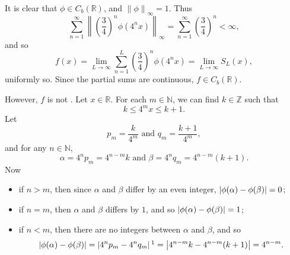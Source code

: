 \documentclass[notoc,notitlepage]{tufte-book}
\newcommand{\norm}[1]{\left\| #1 \right\|}
\begin{document}
\begin{eg}
  It is clear that $\phi \in C_b(\mathbb{R})$, and $\norm{ \phi }_\infty = 1$. Thus
  \begin{equation*}
    \sum_{n=1}^{\infty} \norm{ \left( \frac{3}{4} \right)^n \phi \left( 4^n x \right)}_\infty = \sum_{n=1}^{\infty} \left( \frac{3}{4} \right)^n < \infty,
  \end{equation*}
  and so
  \begin{equation*}
    f(x) = \lim_{L \to \infty} \sum_{n=1}^{L} \left( \frac{3}{4} \right)^n \phi \left( 4^n x \right) = \lim_{L \to \infty} S_L(x),
  \end{equation*}
  uniformly so. Since the partial sums are continuous, $f \in C_b(\mathbb{R})$.

  However, $f$ is not . Let $x \in \mathbb{R}$. For each $m \in \mathbb{N}$, we can find $k \in \mathbb{Z}$ such that
  \begin{equation*}
    k \leq 4^m x \leq k + 1.
  \end{equation*}
  Let
  \begin{equation*}
    p_m = \frac{k}{4^m} \text{ and } q_m = \frac{k + 1}{4^m},
  \end{equation*}
  and for any $n \in \mathbb{N}$,
  \begin{equation*}
    \alpha = 4^n p_m = 4^{n - m} k \text{ and } \beta = 4^n q_m = 4^{ n - m } ( k + 1 ).
  \end{equation*}
  Now
  \begin{itemize}
    \item if $n > m$, then since $\alpha$ and $\beta$ differ by an even integer, $\left| \phi ( \alpha ) - \phi ( \beta ) \right| = 0$;
    \item if $n = m$, then $\alpha$ and $\beta$ differs by $1$, and so $\left| \phi(\alpha) - \phi(\beta) \right| = 1$;
    \item if $n < m$, then there are no integers between $\alpha$ and $\beta$, and so
      \begin{equation*}
        \abs{ \phi(\alpha) - \phi(\beta) } = \abs{ 4^n p_m - 4^n q_m } \footnotemark = \abs{ 4^{n - m} k - 4^{n - m} ( k + 1 ) } = 4^{n - m}.
      \end{equation*}
  \end{itemize}


\end{eg}
\end{document}
